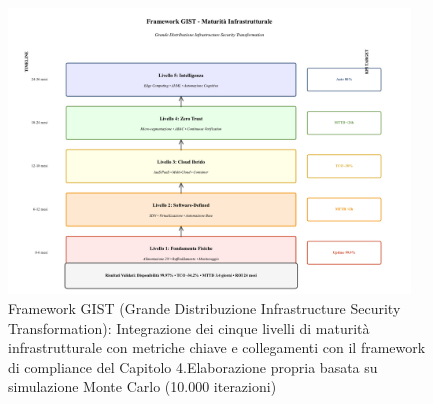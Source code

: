 \begin{figure}[htbp]
\centering
\includegraphics[width=0.95\textwidth]{thesis_figures/cap3/fig_3_3_gist_framework.pdf}
\caption{Framework GIST (Grande Distribuzione Infrastructure Security Transformation): Integrazione dei cinque livelli di maturità infrastrutturale con metriche chiave e collegamenti con il framework di compliance del Capitolo 4.Elaborazione propria basata su simulazione Monte Carlo (10.000 iterazioni)}
\label{fig:framework_gist_complete}
\end{figure}

\clearpage
\printbibliography[
    heading=subbibliography,
    title={Riferimenti Bibliografici del Capitolo 3},
]


\clearpage